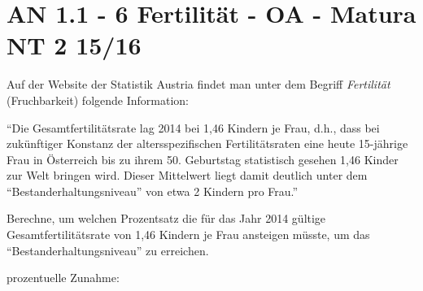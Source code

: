 \section{AN 1.1 - 6 Fertilität - OA - Matura NT 2 15/16}

\begin{beispiel}[AN 1.1]{1} %
Auf der Website der Statistik Austria findet man unter dem Begriff \textit{Fertilität} (Fruchbarkeit) folgende Information:

"`Die Gesamtfertilitätsrate lag 2014 bei 1,46 Kindern je Frau, d.h., dass bei zukünftiger Konstanz der altersspezifischen Fertilitätsraten eine heute 15-jährige Frau in Österreich bis zu ihrem 50. Geburtstag statistisch gesehen 1,46 Kinder zur Welt bringen wird. Dieser Mittelwert liegt damit deutlich unter dem "`Bestanderhaltungsniveau"' von etwa 2 Kindern pro Frau."'

Berechne, um welchen Prozentsatz die für das Jahr 2014 gültige Gesamtfertilitätsrate von 1,46 Kindern je Frau ansteigen müsste, um das "`Bestanderhaltungsniveau"' zu erreichen.

prozentuelle Zunahme: 
\end{beispiel}